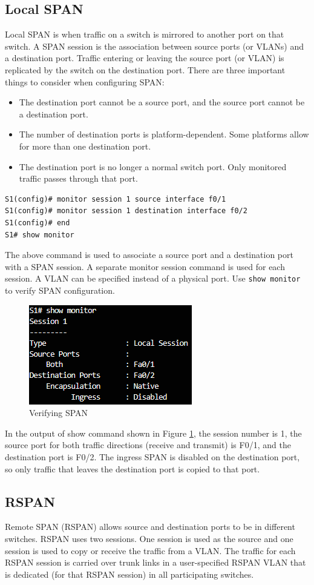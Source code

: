\subsection{Local SPAN}
Local SPAN is when traffic on a switch is mirrored to another port on that switch. A SPAN session is the association between source ports (or VLANs) and a destination port. Traffic entering or leaving the source port (or VLAN) is replicated by the switch on the destination port. There are three important things to consider when configuring SPAN:
\begin{itemize}
\item The destination port cannot be a source port, and the source port cannot be a destination port.
\item The number of destination ports is platform-dependent. Some platforms allow for more than one destination port.
\item The destination port is no longer a normal switch port. Only monitored traffic passes through that port.
\end{itemize}
\begin{verbatim}
S1(config)# monitor session 1 source interface f0/1
S1(config)# monitor session 1 destination interface f0/2
S1(config)# end
S1# show monitor
\end{verbatim}
The above command is used to associate a source port and a destination port with a SPAN session. A separate monitor session command is used for each session. A VLAN can be specified instead of a physical port. Use \texttt{show monitor} to verify SPAN configuration.\par
	\begin{figure}[hbtp]
	\caption{Verifying SPAN}\label{SPAN}
	\centering
	\includegraphics[scale=0.8]{pictures/SPAN.PNG}
	\end{figure}
In the output of show command shown in Figure \ref{SPAN}, the session number is 1, the source port for both traffic directions (receive and transmit) is F0/1, and the destination port is F0/2. The ingress SPAN is disabled on the destination port, so only traffic that leaves the destination port is copied to that port.
\subsection{RSPAN}
Remote SPAN (RSPAN) allows source and destination ports to be in different switches. RSPAN uses two sessions. One session is used as the source and one session is used to copy or receive the traffic from a VLAN. The traffic for each RSPAN session is carried over trunk links in a user-specified RSPAN VLAN that is dedicated (for that RSPAN session) in all participating switches. 